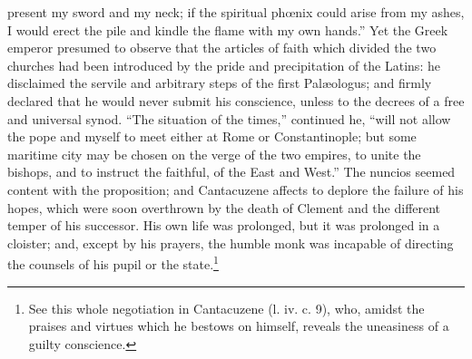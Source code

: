 present my sword and my neck; if the spiritual phœnix could arise from my ashes, I would erect the pile and kindle the flame with my own hands.\texthebrew{}” Yet the Greek emperor presumed to observe that the articles of faith which divided the two churches had been introduced by the pride and precipitation of the Latins: he disclaimed the servile and arbitrary steps of the first Palæologus; and firmly declared that he would never submit his conscience, unless to the decrees of a free and universal synod. \texthebrew{“}The situation of the times,\texthebrew{}” continued he, \texthebrew{“}will not allow the pope and myself to meet either at Rome or Constantinople; but some maritime city may be chosen on the verge of the two empires, to unite the bishops, and to instruct the faithful, of the East and West.\texthebrew{}” The nuncios seemed content with the proposition; and Cantacuzene affects to deplore the failure of his hopes, which were soon overthrown by the death of Clement and the different temper of his successor. His own life was prolonged, but it was prolonged in a cloister; and, except by his prayers, the humble monk was incapable of directing the counsels of his pupil or the state.\footnote{See this whole negotiation in Cantacuzene (l. iv. c. 9), who, amidst the praises and virtues which he bestows on himself, reveals the uneasiness of a guilty conscience.}

